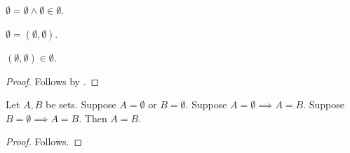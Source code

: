 \begin{axiom}\label{obvious_transport_conjunction}
    $\emptyset=\emptyset\land\emptyset\in\emptyset$.
\end{axiom}

\begin{axiom}\label{obvious_transport_equality}
    $\emptyset=(\emptyset,\emptyset)$.
\end{axiom}

\begin{proposition}\label{obvious_projected_transport}
    $(\emptyset,\emptyset)\in\emptyset$.
\end{proposition}
\begin{proof}
    Follows by
        .
\end{proof}

\begin{proposition}\label{obvious_branch_rule_fixed_point}
    Let $A,B$ be sets.
    Suppose $A=\emptyset$ or $B=\emptyset$.
    Suppose $A=\emptyset\implies A=B$.
    Suppose $B=\emptyset\implies A=B$.
    Then $A=B$.
\end{proposition}
\begin{proof}
    Follows.
\end{proof}
